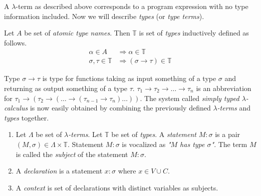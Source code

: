 \documentclass{llncs}
\newcommand{\lterm}{$\lambda$-term\xspace}
\newcommand{\lterms}{$\lambda$-terms\xspace}
\newcommand{\then}{\Rightarrow\xspace}
\newcommand{\ar}{\rightarrow\xspace}
\newcommand{\T}{\mathbb{T}\xspace}
\begin{document}

A \lterm as described above
corresponds to a program expression with no type information
included. Now we will describe \textit{types} (or \textit{type terms}).

\begin{definition}
Let $A$ be set of {\it atomic type names}. 
Then $\mathbb{T}$ is set of {\it types} inductively defined as follows.
\begin{align*}
\alpha      \in A  &\then   \alpha \in \T \\
\sigma,\tau \in \T &\then ( \sigma \ar  \tau ) \in \T 
\end{align*}
\end{definition}

Type $\sigma \ar \tau$ is type for functions taking as input
something of a type $\sigma$ and returning 
as output something of a type $\tau$. 
$\tau_1 \ar \tau_2 \ar \dots \ar \tau_n$ is an abbreviation for 
$\tau_1 \ar (\tau_2 \ar (\dots \ar (\tau_{n-1} \ar \tau_n)\dots))$.
The system called \textit{simply typed $\lambda$-calculus} is now easily obtained by
combining the previously defined \textit{\lterms} and \textit{types} together. 





\begin{definition}\begin{enumerate}
 \item 	Let $\Lambda$ be set of {\it \lterms}. 
	Let $\mathbb{T}$ be set of {\it types}.       
	A {\it statement} $M : \sigma$ is a pair 
	$(M,\sigma) \in \Lambda \times \mathbb{T}$.
	Statement $M : \sigma$ is vocalized as 
	{\it "$M$ has type $\sigma$"}.
	The term $M$ is called the {\it subject} of the 
	statement $M : \sigma$.
 \item A \textit{declaration} is a statement 
 $x : \sigma$ where $x \in V \cup C$.
  
 \item A \textit{context} 
 is set of declarations with distinct variables as subjects.
\end{enumerate}
\end{definition}
\end{document}
